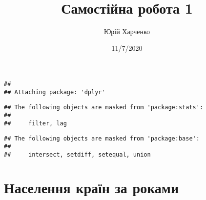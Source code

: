 \documentclass[
]{article}
\title{Самостійна робота 1}
\author{Юрій Харченко}
\date{11/7/2020}
\begin{document}
\maketitle

\begin{verbatim}
## 
## Attaching package: 'dplyr'
\end{verbatim}

\begin{verbatim}
## The following objects are masked from 'package:stats':
## 
##     filter, lag
\end{verbatim}

\begin{verbatim}
## The following objects are masked from 'package:base':
## 
##     intersect, setdiff, setequal, union
\end{verbatim}

\hypertarget{ux43dux430ux441ux435ux43bux435ux43dux43dux44f-ux43aux440ux430ux457ux43d-ux437ux430-ux440ux43eux43aux430ux43cux438}{%
\section{Населення країн за
роками}\label{ux43dux430ux441ux435ux43bux435ux43dux43dux44f-ux43aux440ux430ux457ux43d-ux437ux430-ux440ux43eux43aux430ux43cux438}}
\end{document}
